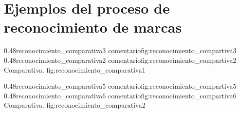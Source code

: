 
\chapter{Ejemplos del proceso de reconocimiento de marcas} %
\label{AppendixA} %


\subfigab
         {0.48}{reconocimiento_comparativa3} {comentario}{fig:reconocimiento_compartiva3}
         {0.48}{reconocimiento_comparativa2} {comentario}{fig:reconocimiento_compartiva2}
         {Comparativa.}
         {fig:reconocimiento_comparativa1}

\subfigab
         {0.48}{reconocimiento_comparativa5} {comentario}{fig:reconocimiento_compartiva5}
         {0.48}{reconocimiento_comparativa6} {comentario}{fig:reconocimiento_compartiva6}
         {Comparativa.}
         {fig:reconocimiento_comparativa2}


